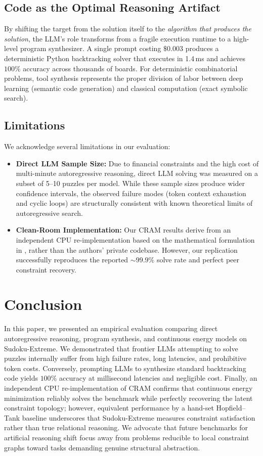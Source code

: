 \documentclass{article} %
\begin{document}
\subsection{Code as the Optimal Reasoning Artifact}
By shifting the target from the solution itself to the \textit{algorithm that produces the solution}, the LLM's role transforms from a fragile execution runtime to a high-level program synthesizer. A single prompt costing $\$0.003$ produces a deterministic Python backtracking solver that executes in 1.4\,ms and achieves $100\%$ accuracy across thousands of boards. For deterministic combinatorial problems, tool synthesis represents the proper division of labor between deep learning (semantic code generation) and classical computation (exact symbolic search).

\subsection{Limitations}
We acknowledge several limitations in our evaluation:
\begin{itemize}
    \item \textbf{Direct LLM Sample Size:} Due to financial constraints and the high cost of multi-minute autoregressive reasoning, direct LLM solving was measured on a subset of 5--10 puzzles per model. While these sample sizes produce wider confidence intervals, the observed failure modes (token context exhaustion and cyclic loops) are structurally consistent with known theoretical limits of autoregressive search.
    \item \textbf{Clean-Room Implementation:} Our CRAM results derive from an independent CPU re-implementation based on the mathematical formulation in \citet{hoover2026classical}, rather than the authors' private codebase. However, our replication successfully reproduces the reported $\sim 99.9\%$ solve rate and perfect peer constraint recovery.
\end{itemize}

\section{Conclusion}
\label{sec:conclusion}

In this paper, we presented an empirical evaluation comparing direct autoregressive reasoning, program synthesis, and continuous energy models on Sudoku-Extreme. We demonstrated that frontier LLMs attempting to solve puzzles internally suffer from high failure rates, long latencies, and prohibitive token costs. Conversely, prompting LLMs to synthesize standard backtracking code yields $100\%$ accuracy at millisecond latencies and negligible cost. Finally, an independent CPU re-implementation of CRAM confirms that continuous energy minimization reliably solves the benchmark while perfectly recovering the latent constraint topology; however, equivalent performance by a hand-set Hopfield--Tank baseline underscores that Sudoku-Extreme measures constraint satisfaction rather than true relational reasoning. We advocate that future benchmarks for artificial reasoning shift focus away from problems reducible to local constraint graphs toward tasks demanding genuine structural abstraction.



\end{document}
